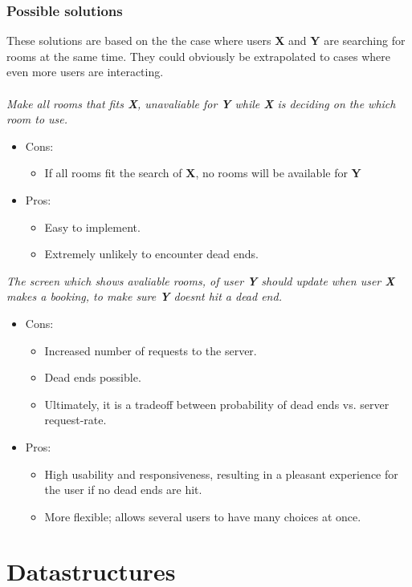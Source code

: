 \subsubsection*{Possible solutions}
These solutions are based on the the case where users \textbf{X} and \textbf{Y} are searching for rooms at the same time. They could obviously be extrapolated to cases where even more users are interacting. \\ \\
\emph{Make all rooms that fits \textbf{X}, unavaliable for \textbf{Y} while \textbf{X} is deciding on the which room to use.}
	\begin{itemize}
	\item Cons:
		\begin{itemize}
		\item If all rooms fit the search of \textbf{X}, no rooms will be available for \textbf{Y} 
		\end{itemize}
	\item Pros:
		\begin{itemize}
		\item Easy to implement.
		\item Extremely unlikely to encounter dead ends.
		\end{itemize}
	\end{itemize}
\emph{The screen which shows avaliable rooms, of user \textbf{Y} should update when user \textbf{X} makes a booking, to make sure \textbf{Y} doesnt hit a dead end.}
	\begin{itemize}
	\item Cons:
		\begin{itemize}
		\item Increased number of requests to the server.
		\item Dead ends possible.
		\item Ultimately, it is a tradeoff between probability of dead ends vs. server request-rate.
		\end{itemize}
	\item Pros:
		\begin{itemize}
		\item High usability and responsiveness, resulting in a pleasant experience for the user if no dead ends are hit. 
		\item More flexible; allows several users to have many choices at once.
		\end{itemize}
	\end{itemize}

\section{Datastructures}


